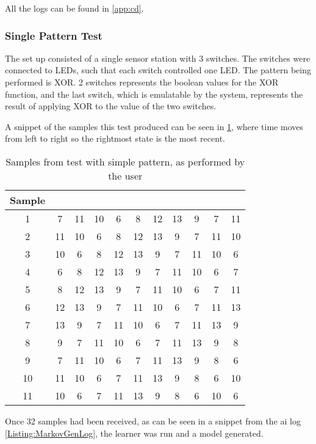 All the logs can be found in \cref{app:cd}. 
\subsubsection{Single Pattern Test}\label{subsec:singlePatternTest}
The set up consisted of a single sensor station with 3 switches. The switches were connected to LEDs, such that each switch controlled one LED. The pattern being performed is XOR. 2 switches represents the boolean values for the XOR function, and the last switch, which is emulatable by the system, represents the result of applying XOR to the value of the two switches.

A snippet of the samples this test produced can be seen in \cref{Table:SampleSnippet}, where time moves from left to right so the rightmost state is the most recent.
\begin{center}

\begin{table}[htbp]
  \centering
  \begin{tabular}{c c c c c c c c c c c}
    \toprule
    Sample & & & & & & & & & &  \\ \midrule
           1 & 7 & 11 & 10 & 6 & 8 & 12 & 13 & 9 & 7 & 11 \\
           2 & 11 & 10 & 6 & 8 & 12 & 13 & 9 & 7 & 11 & 10 \\
           3 & 10 & 6 & 8 & 12 & 13 & 9 & 7 & 11 & 10 & 6 \\
           4 & 6  & 8 & 12 & 13 & 9 & 7 & 11 & 10 & 6 & 7 \\
           5 & 8 & 12 & 13 & 9 & 7 & 11 & 10 & 6 & 7 & 11 \\
           6 & 12 & 13 & 9 & 7 & 11 & 10 & 6 & 7 & 11 & 13 \\
           7 & 13 & 9 & 7 & 11 & 10 & 6 & 7 & 11 & 13 & 9 \\
           8 & 9 & 7 & 11 & 10 & 6 & 7 & 11 & 13 & 9 & 8 \\
           9 & 7 & 11 & 10 & 6 & 7 & 11 & 13 & 9 & 8 & 6 \\
           10& 11 & 10 & 6 & 7 & 11 & 13 & 9 & 8 & 6 & 10 \\
           11 & 10 & 6 & 7 & 11 & 13 & 9 & 8 & 6 & 10 & 6
     \\ \bottomrule
  \end{tabular}
  \caption{Samples from test with simple pattern, as performed by the user}\label{Table:SampleSnippet}
\end{table}
\end{center}
Once 32 samples had been received, as can be seen in a snippet from the ai log \cref{Listing:MarkovGenLog}, the learner was run and a model generated.

